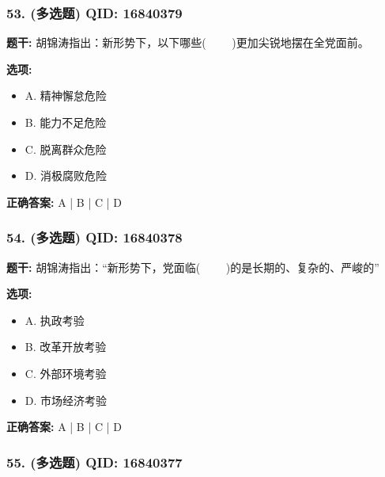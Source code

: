 \documentclass[12pt,UTF8]{ctexart}
\begin{document}
\subsubsection*{53. (多选题) \small QID: 16840379}

\textbf{题干:}
胡锦涛指出：新形势下，以下哪些(     )更加尖锐地摆在全党面前。

\textbf{选项:}
\begin{itemize}[leftmargin=*]

  \item A. 精神懈怠危险

  \item B. 能力不足危险

  \item C. 脱离群众危险

  \item D. 消极腐败危险

\end{itemize}

\textbf{正确答案:}
A | B | C | D

\vspace{0.3em}\hrulefill\vspace{0.7em}

\subsubsection*{54. (多选题) \small QID: 16840378}

\textbf{题干:}
胡锦涛指出：“新形势下，党面临(     )的是长期的、复杂的、严峻的”

\textbf{选项:}
\begin{itemize}[leftmargin=*]

  \item A. 执政考验

  \item B. 改革开放考验

  \item C. 外部环境考验

  \item D. 市场经济考验

\end{itemize}

\textbf{正确答案:}
A | B | C | D

\vspace{0.3em}\hrulefill\vspace{0.7em}

\subsubsection*{55. (多选题) \small QID: 16840377}
\end{document}
